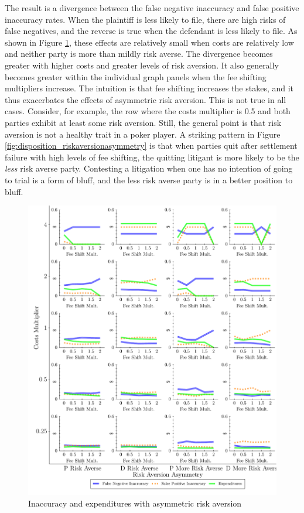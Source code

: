 \documentclass{article}
\begin{document}
The result is a divergence between the false negative inaccuracy and false positive inaccuracy rates. When the plaintiff is less likely to file, there are high risks of false negatives, and the reverse is true when the defendant is less likely to file. As shown in Figure \ref{fig:accexp_riskaversionasymmetry}, these effects are relatively small when costs are relatively low and neither party is more than mildly risk averse. The divergence becomes greater with higher costs and greater levels of risk aversion. It also generally becomes greater within the individual graph panels when the fee shifting multipliers increase. The intuition is that fee shifting increases the stakes, and it thus exacerbates the effects of asymmetric risk aversion. This is not true in all cases. Consider, for example, the row where the costs multiplier is 0.5 and both parties exhibit at least some risk aversion. Still, the general point is that risk aversion is not a healthy trait in a poker player. A striking pattern in Figure \ref{fig:disposition_riskaversionasymmetry} is that when parties quit after settlement failure with high levels of fee shifting, the quitting litigant is more likely to be the \textit{less} risk averse party. Contesting a litigation when one has no intention of going to trial is a form of bluff, and the less risk averse party is in a better position to bluff. 

\begin{figure}[h!]
\centering
\includegraphics[scale=0.50, trim={0in 0in 0in 0in}, clip]{../Figures/Accuracy and Expenditures Varying Risk Aversion Asymmetry.pdf}
\caption{Inaccuracy and expenditures with asymmetric risk aversion}
\label{fig:accexp_riskaversionasymmetry}
\end{figure}
\end{document}
